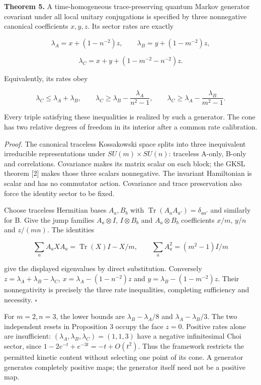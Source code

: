 \documentclass[
  11pt,
  a4paper,
]{article}
\begin{document}
\textbf{Theorem 5.} A time-homogeneous trace-preserving quantum Markov generator covariant under all local unitary conjugations is specified by three nonnegative canonical coefficients \(x,y,z\). Its sector rates are exactly

\[\lambda_A=x+(1-n^{-2})z,\qquad
\lambda_B=y+(1-m^{-2})z,\]

\[\lambda_C=x+y+(1-m^{-2}-n^{-2})z.\]

Equivalently, its rates obey

\[\lambda_C\le\lambda_A+\lambda_B,\qquad
\lambda_C\ge\lambda_B-\frac{\lambda_A}{n^2-1},\qquad
\lambda_C\ge\lambda_A-\frac{\lambda_B}{m^2-1}.\]

Every triple satisfying these inequalities is realized by such a generator. The cone has two relative degrees of freedom in its interior after a common rate calibration.

\emph{Proof.} The canonical traceless Kossakowski space splits into three inequivalent irreducible representations under \(SU(m)\times SU(n)\): traceless A-only, B-only and correlations. Covariance makes its matrix scalar on each block; the GKSL theorem {[}2{]} makes those three scalars nonnegative. The invariant Hamiltonian is scalar and has no commutator action. Covariance and trace preservation also force the identity sector to be fixed.

Choose traceless Hermitian bases \(A_a,B_b\) with \(\operatorname{Tr}(A_aA_{a'})=\delta_{aa'}\) and similarly for B. Give the jump families \(A_a\otimes I\), \(I\otimes B_b\) and \(A_a\otimes B_b\) coefficients \(x/m\), \(y/n\) and \(z/(mn)\). The identities

\[\sum_aA_aXA_a=\operatorname{Tr}(X)I-X/m,\qquad
\sum_a A_a^2=(m^2-1)I/m\]

give the displayed eigenvalues by direct substitution. Conversely \(z=\lambda_A+\lambda_B-\lambda_C\), \(x=\lambda_A-(1-n^{-2})z\) and \(y=\lambda_B-(1-m^{-2})z\). Their nonnegativity is precisely the three rate inequalities, completing sufficiency and necessity. \(\square\)

For \(m=2,n=3\), the lower bounds are \(\lambda_B-\lambda_A/8\) and \(\lambda_A-\lambda_B/3\). The two independent resets in Proposition 3 occupy the face \(z=0\). Positive rates alone are insufficient: \((\lambda_A,\lambda_B,\lambda_C)=(1,1,3)\) have a negative infinitesimal Choi sector, since \(1-2e^{-t}+e^{-3t}=-t+O(t^2)\). Thus the framework restricts the permitted kinetic content without selecting one point of its cone. A generator generates completely positive maps; the generator itself need not be a positive map.
\end{document}
